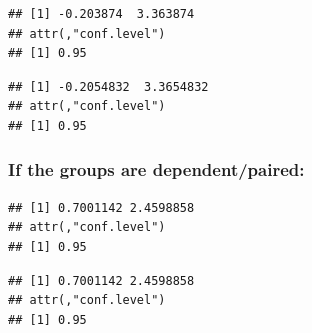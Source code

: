 \documentclass[]{article}
\newenvironment{Shaded}{\begin{snugshade}}{\end{snugshade}}
\newcommand{\DataTypeTok}[1]{\textcolor[rgb]{0.13,0.29,0.53}{#1}}
\newcommand{\KeywordTok}[1]{\textcolor[rgb]{0.13,0.29,0.53}{\textbf{#1}}}
\newcommand{\NormalTok}[1]{#1}
\newcommand{\OperatorTok}[1]{\textcolor[rgb]{0.81,0.36,0.00}{\textbf{#1}}}
\begin{document}
\begin{Shaded}
\end{Shaded}

\begin{verbatim}
## [1] -0.203874  3.363874
## attr(,"conf.level")
## [1] 0.95
\end{verbatim}

\begin{Shaded}
\end{Shaded}

\begin{verbatim}
## [1] -0.2054832  3.3654832
## attr(,"conf.level")
## [1] 0.95
\end{verbatim}

\hypertarget{if-the-groups-are-dependentpaired}{%
\subsubsection{If the groups are
dependent/paired:}\label{if-the-groups-are-dependentpaired}}

\begin{Shaded}
\end{Shaded}

\begin{verbatim}
## [1] 0.7001142 2.4598858
## attr(,"conf.level")
## [1] 0.95
\end{verbatim}

\begin{Shaded}
\end{Shaded}

\begin{verbatim}
## [1] 0.7001142 2.4598858
## attr(,"conf.level")
## [1] 0.95
\end{verbatim}
\end{document}
